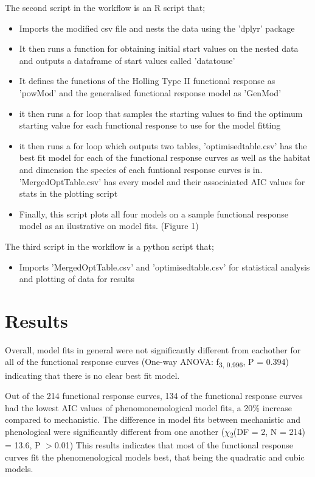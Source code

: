 \documentclass[11pt]{article}
\begin{document}
The second script in the workflow is an R script that;
\begin{itemize}
	\item Imports the modified csv file and nests the data using the 'dplyr' package 
	\item It then runs a function for obtaining initial start values on the nested data and outputs a dataframe of start values called 'datatouse'
	\item It defines the functions of the Holling Type II functional response as 'powMod' and the generalised functional response model as 'GenMod'
	\item it then runs a for loop that samples the starting values to find the optimum starting value for each functional response to use for the model fitting
	\item it then runs a for loop which outputs two tables, 'optimisedtable.csv' has the best fit model for each of the functional response curves as well as the habitat and dimension the species of each funtional response curves is in. 'MergedOptTable.csv' has every model and their associaiated AIC values for stats in the plotting script 
	\item Finally, this script plots all four models on a sample functional response model as an ilustrative on model fits. (Figure 1)
\end{itemize}

The third script in the workflow is a python script that;
\begin{itemize}
	\item Imports 'MergedOptTable.csv' and 'optimisedtable.csv' for statistical analysis and plotting of data for results 
\end{itemize}


	\section{Results}
\noindent

Overall, model fits in general were not significantly different from eachother for all of the functional response curves (One-way ANOVA: f\textsubscript{3, 0.996}, P = 0.394) indicating that there is no clear best fit model.

Out of the 214 functional response curves, 134 of the functional response curves had the lowest AIC values of phenomonemological model fits, a 20\% increase compared to mechanistic. The difference in model fits between mechanistic and phenological were significantly different from one another ($\chi$\textsubscript{2}(DF = 2, N = 214) = 13.6, P $>$0.01)  This results indicates that most of the functional response curves fit the phenomenological models best, that being the quadratic and cubic models. 
\end{document}
